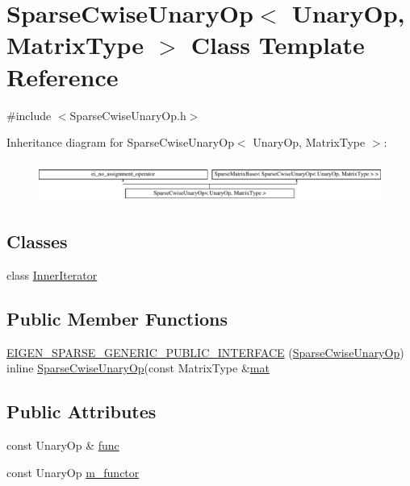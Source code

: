 \hypertarget{class_sparse_cwise_unary_op}{\section{Sparse\-Cwise\-Unary\-Op$<$ Unary\-Op, Matrix\-Type $>$ Class Template Reference}
\label{class_sparse_cwise_unary_op}
}


{\ttfamily \#include $<$Sparse\-Cwise\-Unary\-Op.\-h$>$}

Inheritance diagram for Sparse\-Cwise\-Unary\-Op$<$ Unary\-Op, Matrix\-Type $>$\-:\begin{figure}[H]
\begin{center}
\leavevmode
\includegraphics[height=1.336515cm]{class_sparse_cwise_unary_op}
\end{center}
\end{figure}
\subsection*{Classes}
\begin{DoxyCompactItemize}
\item 
class \hyperlink{class_sparse_cwise_unary_op_1_1_inner_iterator}{Inner\-Iterator}
\end{DoxyCompactItemize}
\subsection*{Public Member Functions}
\begin{DoxyCompactItemize}
\item 
\hyperlink{class_sparse_cwise_unary_op_af4eb16fd08b9bead23294b9a80ea4e11}{E\-I\-G\-E\-N\-\_\-\-S\-P\-A\-R\-S\-E\-\_\-\-G\-E\-N\-E\-R\-I\-C\-\_\-\-P\-U\-B\-L\-I\-C\-\_\-\-I\-N\-T\-E\-R\-F\-A\-C\-E} (\hyperlink{class_sparse_cwise_unary_op}{Sparse\-Cwise\-Unary\-Op}) inline \hyperlink{class_sparse_cwise_unary_op}{Sparse\-Cwise\-Unary\-Op}(const Matrix\-Type \&\hyperlink{uavobjecttemplate_8m_a16a51e808b16c46bbfd36da2e37cd123}{mat}
\end{DoxyCompactItemize}
\subsection*{Public Attributes}
\begin{DoxyCompactItemize}
\item 
const Unary\-Op \& \hyperlink{class_sparse_cwise_unary_op_a635c598c7b4afd3cffcb6ab5046a3c5c}{func}
\item 
const Unary\-Op \hyperlink{class_sparse_cwise_unary_op_aad7e9874474acb12011e14c295432def}{m\-\_\-functor}
\end{DoxyCompactItemize}
